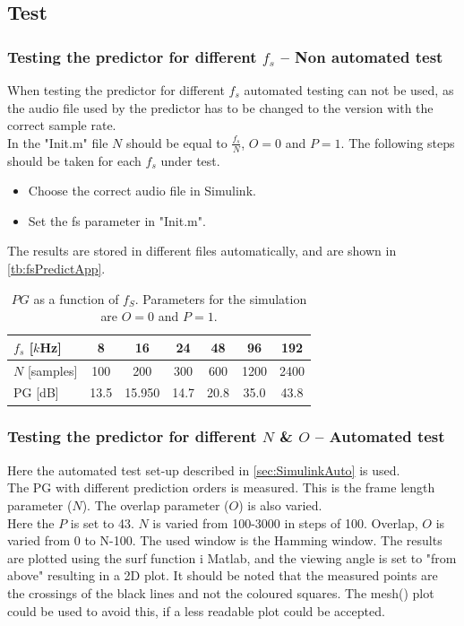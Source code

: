 \subsection{Test}

\subsubsection{Testing the predictor for different $f_s$ -- Non automated test}
When testing the predictor for different $f_s$ automated testing can not be used, as the audio file used by the predictor has to be changed to the version with the correct sample rate. \\ 
In the "Init.m" file $N$ should be equal to $\frac{f_s}{N}$, $O=0$ and $P=1$. The following steps should be taken for each $f_s$ under test.
\begin{itemize}
	\item Choose the correct audio file in Simulink. 
	\item Set the fs parameter in "Init.m". 
\end{itemize}
The results are stored in different files automatically, and are shown in \autoref{tb:fsPredictApp}.

\begin{table}[H]
\centering
\begin{tabular}{|l|c|c|c|c|c|c|}
	\hline
	$f_s$ {[}$k$Hz{]} & 8 & 16 & 24 & 48 & 96 & 192 \\ \hline 
	$N$ {[}samples{]} & 100 & 200 & 300 & 600 & 1200 & 2400 \\ \hline 
	PG {[}dB{]} & 13.5 & 15.950 & 14.7 & 20.8 & 35.0 & 43.8 \\ \hline
\end{tabular}
\caption{$PG$ as a function of $f_S$. Parameters for the simulation are $O=0$ and $P=1$.}
\label{tb:fsPredictApp}
\end{table}  
 
\subsubsection{Testing the predictor for different $N$ \& $O$ -- Automated test}
Here the automated test set-up described in \autoref{sec:SimulinkAuto} is used.\\ 
The PG with different prediction orders is measured. This is the frame length parameter ($N$). The overlap parameter ($O$) is also varied. \\ 
Here the $P$ is set to 43. $N$ is varied from 100-3000 in steps of 100. Overlap, $O$ is varied from 0 to N-100. The used window is the Hamming window. The results are plotted using the surf function i Matlab, and the viewing angle is set to "from above" resulting in a 2D plot. It should be noted that the measured points are the crossings of the black lines and not the coloured squares. The mesh() plot could be used to avoid this, if a less readable plot could be accepted. 

